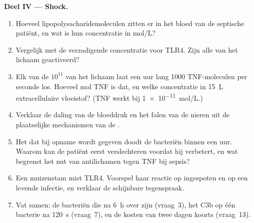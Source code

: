 \begin{problem}
\medskip
\noindent\textbf{Deel IV --- Shock.}
\begin{enumerate}[resume]
  \item Hoeveel lipopolysacharidemoleculen zitten er in het bloed van de
        septische patiënt, en wat is hun concentratie in mol/L?
  \item Vergelijk met de verzadigende concentratie voor TLR4. Zijn alle
         van het lichaam geactiveerd?
  \item Elk van de $10^{11}$  van het lichaam laat een uur
        lang \num{1000} TNF-moleculen per seconde los. Hoeveel mol TNF
        is dat, en welke concentratie in \qty{15}{L} extracellulaire
        vloeistof? (TNF werkt bij \qty{1e-11}{mol/L}.)
  \item Verklaar de daling van de bloeddruk en het falen van de nieren
        uit de plaatselijke mechanismen van de .
  \item Het  dat bij opname wordt gegeven doodt de
        bacteriën binnen een uur. Waarom kan de patiënt eerst
        verslechteren voordat hij verbetert, en wat begrenst het nut
        van antilichamen tegen TNF bij sepsis?
  \item Een muizenstam mist TLR4. Voorspel haar reactie op ingespoten
         en op een levende  infectie, en
        verklaar de schijnbare tegenspraak.
  \item Vat samen: de bacteriën die na \qty{6}{h} over zijn (vraag~3),
        het C3b op één bacterie na \qty{120}{s} (vraag~7), en de kosten
        van twee dagen koorts (vraag~13).
\end{enumerate}
\end{problem}
